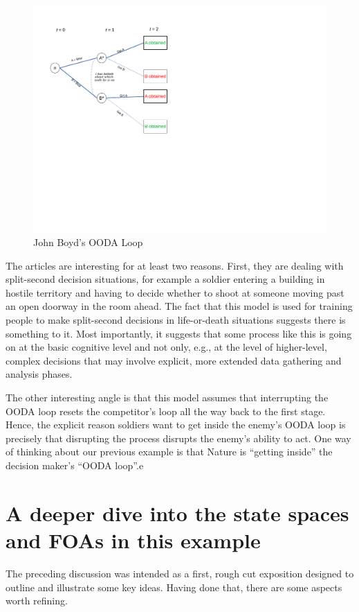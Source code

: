 \documentclass[
11pt,
titlepage,
reqno,
]{article}%
\theoremstyle{definition}
\begin{document}
\begin{figure}[h!]
	\centering
	\includegraphics*[page=14,trim = 0in 2in 0in 0in,scale=.65]{Awareness_Diagrams_All}
	\caption{John Boyd's OODA Loop\label{Diag: p-14}}%
\end{figure}

The articles are interesting for at least two reasons. First, they are dealing with split-second decision situations, for example a soldier entering a building in hostile territory and having to decide whether to shoot at someone moving past an open doorway in the room ahead. The fact that this model is used for training people to make split-second decisions in life-or-death situations suggests there is something to it. Most importantly, it suggests that some process like this is going on at the basic cognitive level and not only, e.g., at the level of higher-level, complex decisions that may involve explicit, more extended data gathering and analysis phases. 

The other interesting angle is that this model assumes that interrupting the OODA loop resets the competitor's loop all the way back to the first stage. Hence, the explicit reason soldiers want to get inside the enemy's OODA loop is precisely that disrupting the process disrupts the enemy's ability to act. One way of thinking about our previous example is that Nature is ``getting inside'' the decision maker's ``OODA loop''.e

\section*{A deeper dive into the state spaces and FOAs in this example}
The preceding discussion was intended as a first, rough cut exposition designed to outline and illustrate some key ideas. Having done that, there are some aspects worth refining.  
\end{document}
